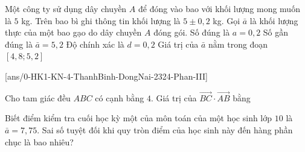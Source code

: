 \begin{ex}%
	Một công ty sử dụng dây chuyền $A$ để đóng vào bao với khối lượng mong muốn là $5$ kg. Trên bao bì ghi thông tin khối lượng là $5 \pm 0{,}2$ kg. Gọi $\bar{a}$ là khối lượng thực của một bao gạo do dây chuyền $A$ đóng gói. 
	\choiceTF
	{Số đúng là $a=0{,}2$}
	{Số gần đúng là $\bar{a}=5{,}2$}
	{\True Độ chính xác là $d=0{,}2$}
	{\True Giá trị của $\bar{a}$ nằm trong đoạn $[4{,}8 ; 5{,}2]$}
\end{ex}

\caukq
{}[ans/0-HK1-KN-4-ThanhBinh-DongNai-2324-Phan-III]

\begin{ex}%
	Cho tam giác đều $ABC$ có cạnh bằng $4$. Giá trị của $\overrightarrow{BC} \cdot \overrightarrow{AB}$ bằng
\end{ex}

\begin{ex}%
	Biết điểm kiểm tra cuối học kỳ một của môn toán của một học sinh lớp $10$ là $\bar{a}=7{,}75$. Sai số tuyệt đối khi quy tròn điểm của học sinh này đến hàng phần chục là bao nhiêu?
\end{ex}

